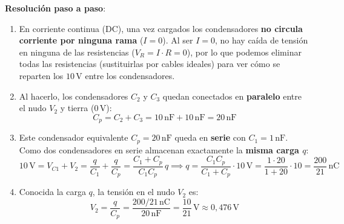 \begin{ejercicio}
\textbf{Resolución paso a paso}:
\begin{enumerate}
    \item En corriente continua (DC), una vez cargados los condensadores \textbf{no circula corriente por ninguna rama} ($I = 0$). Al ser $I = 0$, no hay caída de tensión en ninguna de las resistencias ($V_R = I\cdot R = 0$), por lo que podemos eliminar todas las resistencias (sustituirlas por cables ideales) para ver cómo se reparten los $10\,\si{\volt}$ entre los condensadores.
    \item Al hacerlo, los condensadores $C_2$ y $C_3$ quedan conectados en \textbf{paralelo} entre el nudo $V_2$ y tierra ($0\,\si{\volt}$):
    \begin{equation*}
        C_p = C_2 + C_3 = 10\,\si{\nano\farad} + 10\,\si{\nano\farad} = 20\,\si{\nano\farad}
    \end{equation*}
    \item Este condensador equivalente $C_p = 20\,\si{\nano\farad}$ queda en \textbf{serie} con $C_1 = 1\,\si{\nano\farad}$. Como dos condensadores en serie almacenan exactamente la \textbf{misma carga $q$}:
    \begin{equation*}
        10\,\si{\volt} = V_{C1} + V_2 = \frac{q}{C_1} + \frac{q}{C_p} = \frac{C_1 + C_p}{C_1 C_p}\,q \implies q = \frac{C_1 C_p}{C_1 + C_p}\cdot 10\,\si{\volt} = \frac{1\cdot 20}{1 + 20}\cdot 10 = \frac{200}{21}\,\si{\nano\coulomb}
    \end{equation*}
    \item Conocida la carga $q$, la tensión en el nudo $V_2$ es:
    \begin{equation*}
        \boxed{V_2 = \frac{q}{C_p} = \frac{200/21\,\si{\nano\coulomb}}{20\,\si{\nano\farad}} = \frac{10}{21}\,\si{\volt} \approx 0{,}476\,\si{\volt}}
    \end{equation*}
\end{enumerate}
\end{ejercicio}

